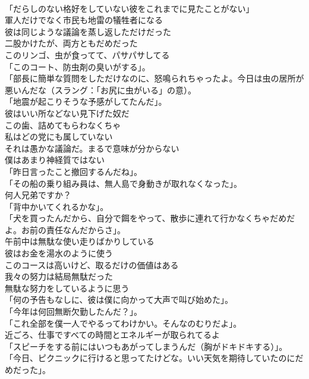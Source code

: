 \documentclass[8pt]{extreport}
\begin{document}
\begin{CJK}{UTF8}{min}
\\	「だらしのない格好をしていない彼をこれまでに見たことがない」	
\\	軍人だけでなく市民も地雷の犠牲者になる	
\\	彼は同じような議論を蒸し返しただけだった	
\\	二股かけたが、両方ともだめだった	
\\	このリンゴ、虫が食ってて、パサパサしてる	
\\	「このコート、防虫剤の臭いがする」。	
\\	「部長に簡単な質問をしただけなのに、怒鳴られちゃったよ。今日は虫の居所が悪いんだな（スラング：「お尻に虫がいる」の意）。	
\\	「地震が起こりそうな予感がしてたんだ」。	
\\	彼はいい所などない見下げた奴だ	
\\	この歯、詰めてもらわなくちゃ	
\\	私はどの党にも属していない	
\\	それは愚かな議論だ。まるで意味が分からない	
\\	僕はあまり神経質ではない	
\\	「昨日言ったこと撤回するんだね」。	
\\	「その船の乗り組み員は、無人島で身動きが取れなくなった」。	
\\	何人兄弟ですか？	
\\	「背中かいてくれるかな」。	
\\	「犬を買ったんだから、自分で餌をやって、散歩に連れて行かなくちゃだめだよ。お前の責任なんだからさ」。	
\\	午前中は無駄な使い走りばかりしている	
\\	彼はお金を湯水のように使う	
\\	このコースは高いけど、取るだけの価値はある	
\\	我々の努力は結局無駄だった	
\\	無駄な努力をしているように思う	
\\	「何の予告もなしに、彼は僕に向かって大声で叫び始めた」。	
\\	「今年は何回無断欠勤したんだ？」。	
\\	「これ全部を僕一人でやるってわけかい。そんなのむりだよ」。	
\\	近ごろ、仕事ですべての時間とエネルギーが取られてるよ	
\\	「スピーチをする前にはいつもあがってしまうんだ（胸がドキドキする）」。	
\\	「今日、ピクニックに行けると思ってたけどな。いい天気を期待していたのにだめだった」。	

\end{CJK}
\end{document}
